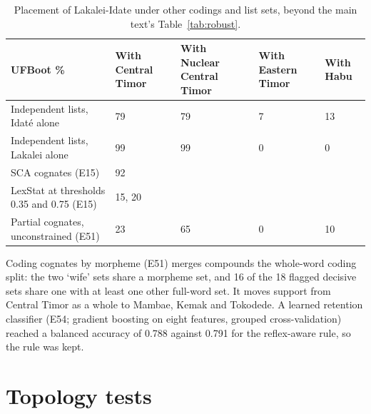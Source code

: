 \documentclass[11pt]{article}
\newcommand{\hd}[1]{\begin{minipage}[b]{\linewidth}\raggedright #1\end{minipage}}
\begin{document}
\begin{table}[tbp]
\caption{Placement of Lakalei-Idate under other codings and list sets,
beyond the main text's Table~\ref{tab:robust}.}
\label{tab:codings}
\begin{tabularx}{\linewidth}{@{}L{2.3}L{0.7}L{0.7}L{0.65}L{0.65}@{}}
\toprule
\hd{UFBoot \%} & \hd{With Central Timor} & \hd{With Nuclear Central Timor} & \hd{With Eastern Timor} & \hd{With Habu} \\
\midrule
Independent lists, Idaté alone & 79 & 79 & 7 & 13 \\
Independent lists, Lakalei alone & 99 & 99 & 0 & 0 \\
SCA cognates (E15) & 92 & & & \\
LexStat at thresholds 0.35 and 0.75 (E15) & 15, 20 & & & \\
Partial cognates, unconstrained (E51) & 23 & 65 & 0 & 10 \\
\bottomrule
\end{tabularx}
\end{table}

Coding cognates by morpheme (E51) merges compounds the whole-word coding split: the two `wife' sets share a morpheme set, and 16 of the 18 flagged decisive sets share one with at least one other full-word set. It moves support from Central Timor as a whole to Mambae, Kemak and Tokodede. A learned retention classifier (E54; gradient boosting on eight features, grouped cross-validation) reached a balanced accuracy of 0.788 against 0.791 for the reflex-aware rule, so the rule was kept.

\section{Topology tests}\label{sec:topology}
\end{document}
